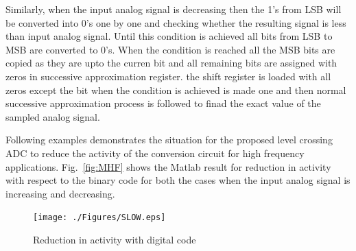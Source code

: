 \par
\hspace{0.6cm} Similarly, when the input analog signal is decreasing then the 1's from LSB will be converted into 0's one by one and checking whether the resulting signal is less than input analog signal. Until this condition is achieved all bits from LSB to MSB are converted to 0's. When the condition is reached all the MSB bits are copied as they are upto the curren bit and all remaining bits are assigned with zeros in successive approximation register. the shift register is loaded with all zeros except the bit when the condition is achieved is made one and then normal successive approximation process is followed to finad the exact value of the sampled analog signal.   

\par
\hspace{0.6cm} Following examples demonstrates the situation for the proposed level crossing ADC to reduce the activity of the conversion circuit for high frequency applications. Fig.~\ref{fig:MHF} shows the Matlab result for reduction in activity with respect to the binary code for both the cases when the input analog signal is increasing and decreasing.

\begin{figure}[H]
	\begin{center}
		\texttt{[image: ./Figures/SLOW.eps]}
		\caption{Reduction in activity with digital code}
		\label{fig:MLF}
	\end{center}
\end{figure}


